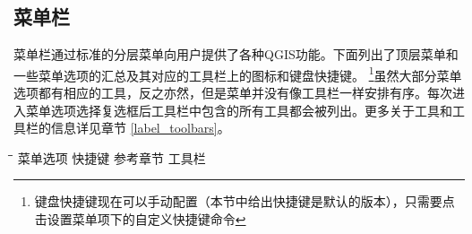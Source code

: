 
\subsection{菜单栏}\label{label_menubar}

菜单栏通过标准的分层菜单向用户提供了各种QGIS功能。下面列出了顶层菜单和一些菜单选项的汇总及其对应的工具栏上的图标和键盘快捷键。 \footnote{键盘快捷键现在可以手动配置（本节中给出快捷键是默认的版本），只需要点击设置菜单项下的自定义快捷键命令}虽然大部分菜单选项都有相应的工具，反之亦然，但是菜单并没有像工具栏一样安排有序。每次进入菜单选项选择复选框后工具栏中包含的所有工具都会被列出。更多关于工具和工具栏的信息详见章节 \ref{label_toolbars}。

\begin{tabbing}
\hspace{5.5cm}\=\hspace{3cm}\=\hspace{3.5cm}\= \kill
\hspace{1cm} 菜单选项 \> 快捷键 \> 参考章节 \> 工具栏\\
\end{tabbing}


